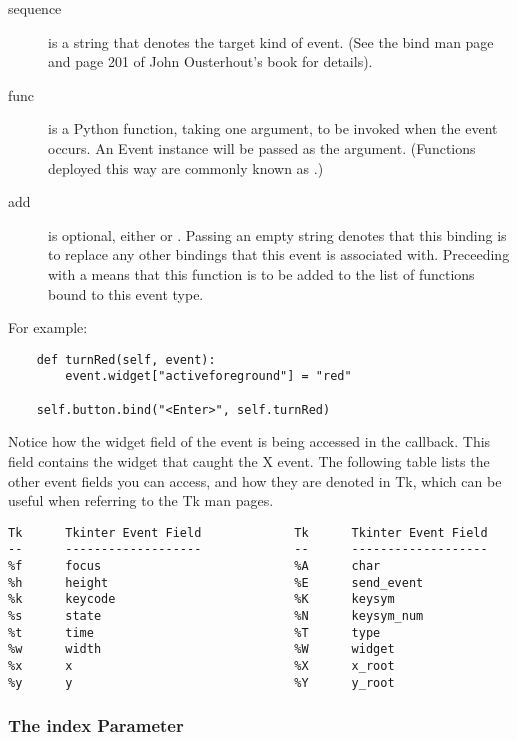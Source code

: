 \begin{description}
\item[sequence]
is a string that denotes the target kind of event.  (See the bind
man page and page 201 of John Ousterhout's book for details).

\item[func]
is a Python function, taking one argument, to be invoked when the
event occurs.  An Event instance will be passed as the argument.
(Functions deployed this way are commonly known as .)

\item[add]
is optional, either \samp{} or \samp{+}.  Passing an empty string
denotes that this binding is to replace any other bindings that this
event is associated with.  Preceeding with a \samp{+} means that this
function is to be added to the list of functions bound to this event type.
\end{description}

For example:
\begin{verbatim}
    def turnRed(self, event):
        event.widget["activeforeground"] = "red"

    self.button.bind("<Enter>", self.turnRed)
\end{verbatim}

Notice how the widget field of the event is being accessed in the
 callback.  This field contains the widget that
caught the X event.  The following table lists the other event fields
you can access, and how they are denoted in Tk, which can be useful
when referring to the Tk man pages.

\begin{verbatim}
Tk      Tkinter Event Field             Tk      Tkinter Event Field 
--      -------------------             --      -------------------
%f      focus                           %A      char
%h      height                          %E      send_event
%k      keycode                         %K      keysym
%s      state                           %N      keysym_num
%t      time                            %T      type
%w      width                           %W      widget
%x      x                               %X      x_root
%y      y                               %Y      y_root
\end{verbatim}


\subsubsection{The index Parameter} %

